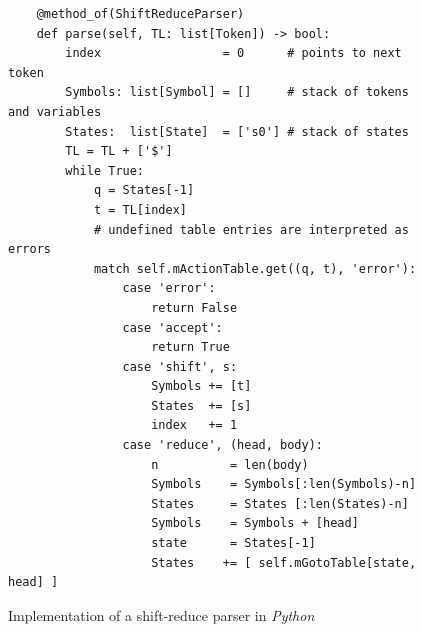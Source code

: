 \begin{figure}[!ht]
\centering
\begin{verbatim}
    @method_of(ShiftReduceParser)
    def parse(self, TL: list[Token]) -> bool:
        index                 = 0      # points to next token
        Symbols: list[Symbol] = []     # stack of tokens and variables
        States:  list[State]  = ['s0'] # stack of states
        TL = TL + ['$']
        while True:
            q = States[-1]
            t = TL[index]
            # undefined table entries are interpreted as errors
            match self.mActionTable.get((q, t), 'error'):
                case 'error':
                    return False
                case 'accept':
                    return True
                case 'shift', s:
                    Symbols += [t]
                    States  += [s]
                    index   += 1
                case 'reduce', (head, body):
                    n          = len(body)
                    Symbols    = Symbols[:len(Symbols)-n]
                    States     = States [:len(States)-n]
                    Symbols    = Symbols + [head]
                    state      = States[-1]
                    States    += [ self.mGotoTable[state, head] ]
\end{verbatim} 
\vspace*{-0.3cm}
\caption{Implementation of a shift-reduce parser in \textsl{Python}}
\label{fig:01-Shift-Reduce-Parser-Pure.ipynb:parse}
\end{figure} %

